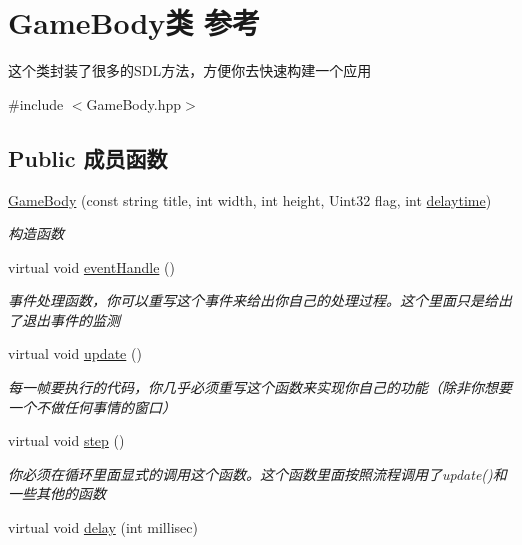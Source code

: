 \hypertarget{class_game_body}{}\section{Game\+Body类 参考}
\label{class_game_body}


这个类封装了很多的\+S\+D\+L方法，方便你去快速构建一个应用  




{\ttfamily \#include $<$Game\+Body.\+hpp$>$}

\subsection*{Public 成员函数}
\begin{DoxyCompactItemize}
\item 
\mbox{\hyperlink{class_game_body_ad93266a1461592dbc9e9f452adff1304}{Game\+Body}} (const string title, int width, int height, Uint32 flag, int \mbox{\hyperlink{class_game_body_a7a92a21e03a1032a60fa925d21d4a54a}{delaytime}})
\begin{DoxyCompactList}\small\item\em 构造函数 \end{DoxyCompactList}\item 
virtual void \mbox{\hyperlink{class_game_body_a87994250c16faae42aeb68ff98031589}{event\+Handle}} ()
\begin{DoxyCompactList}\small\item\em 事件处理函数，你可以重写这个事件来给出你自己的处理过程。这个里面只是给出了退出事件的监测 \end{DoxyCompactList}\item 
virtual void \mbox{\hyperlink{class_game_body_abeff43d0ab34cf69977c386736953552}{update}} ()
\begin{DoxyCompactList}\small\item\em 每一帧要执行的代码，你几乎必须重写这个函数来实现你自己的功能（除非你想要一个不做任何事情的窗口） \end{DoxyCompactList}\item 
virtual void \mbox{\hyperlink{class_game_body_a4eca53ae69ac545e3e3666d7929a9cf4}{step}} ()
\begin{DoxyCompactList}\small\item\em 你必须在循环里面显式的调用这个函数。这个函数里面按照流程调用了update()和一些其他的函数 \end{DoxyCompactList}\item 
virtual void \mbox{\hyperlink{class_game_body_a402e91bd648142d2b4925a6923860852}{delay}} (int millisec)

\end{DoxyCompactItemize}
